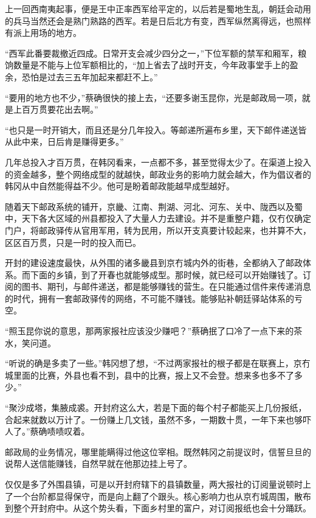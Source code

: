 上一回西南夷起事，便是王中正率西军给平定的，以后若是蜀地生乱，朝廷会动用的兵马当然还会是熟门熟路的西军。若是日后北方有变，西军纵然离得远，也照样有派上用场的地方。

“西军此番要裁撤近四成。日常开支会减少四分之一，”下位军额的禁军和厢军，粮饷数量是不能与上位军额相比的，“加上省去了战时开支，今年政事堂手上的盈余，恐怕是过去三五年加起来都赶不上。”

“要用的地方也不少，”蔡确很快的接上去，“还要多谢玉昆你，光是邮政局一项，就是上百万贯要花出去啊。”

“也只是一时开销大，而且还是分几年投入。等邮递所遍布乡里，天下邮件递送皆从此中来，日后肯是赚得更多。”

几年总投入才百万贯，在韩冈看来，一点都不多，甚至觉得太少了。在渠道上投入的资金越多，整个网络成型的就越快，邮政业务的影响力就会越大，作为倡议者的韩冈从中自然能得益不少。他可是盼着邮政能越早成型越好。

随着天下邮政系统的铺开，京畿、江南、荆湖、河北、河东、关中、陇西以及蜀中，天下各大区域的州县都投入了大量人力去建设。并不是重整户籍，仅冇仅确定门户，将邮政驿传从官用军用，转为民用，所以开支真要计较起来，也并算不大，区区百万贯，只是一时的投入而已。

开封的建设速度最快，从外围的诸多畿县到京冇城内外的街巷，全都纳入了邮政体系。而下面的乡镇，到了开春也就能够成型。那时候，就已经可以开始赚钱了。订阅的图书、期刊，与邮件递送，都是能够赚钱的营生。在只能通过信件来传递消息的时代，拥有一套邮政驿传的网络，不可能不赚钱。能够贴补朝廷驿站体系的亏空。

“照玉昆你说的意思，那两家报社应该没少赚吧？”蔡确抿了口冷了一点下来的茶水，笑问道。

“听说的确是多卖了一些。”韩冈想了想，“不过两家报社的根子都是在联赛上，京冇城里面的比赛，外县也看不到，县中的比赛，报上又不会登。想来多也多不了多少。”

“聚沙成塔，集腋成裘。开封府这么大，若是下面的每个村子都能买上几份报纸，合起来就数以万计了。一份赚上几文钱，虽然不多，一期数十贯，一年下来也够吓人了。”蔡确啧啧叹着。

邮政局的业务情况，哪里能瞒得过他这位宰相。既然韩冈之前提议时，信誓旦旦的说帮人送信能赚钱，自然早就在他那边挂上号了。

仅仅是多了外围县镇，可是以开封府辖下的县镇数量，两大报社的订阅量说顿时上了一个台阶都显得保守，而是向上翻了个跟头。核心影响力也从京冇城周围，散布到整个开封府中。从这个势头看，下面乡村里的富户，对订阅报纸也会十分踊跃。

